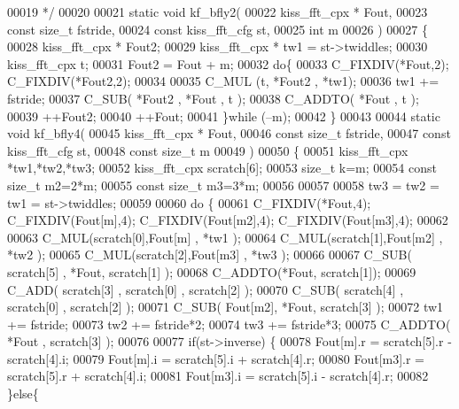 \begin{DoxyCode}
00019 \textcolor{comment}{ */}
00020 
00021 \textcolor{keyword}{static} \textcolor{keywordtype}{void} kf_bfly2(
00022         kiss_fft_cpx * Fout,
00023         \textcolor{keyword}{const} \textcolor{keywordtype}{size\_t} fstride,
00024         \textcolor{keyword}{const} kiss_fft_cfg st,
00025         \textcolor{keywordtype}{int} m
00026         )
00027 \{
00028     kiss_fft_cpx * Fout2;
00029     kiss_fft_cpx * tw1 = st->twiddles;
00030     kiss_fft_cpx t;
00031     Fout2 = Fout + m;
00032     \textcolor{keywordflow}{do}\{
00033         C_FIXDIV(*Fout,2); C_FIXDIV(*Fout2,2);
00034 
00035         C_MUL (t,  *Fout2 , *tw1);
00036         tw1 += fstride;
00037         C_SUB( *Fout2 ,  *Fout , t );
00038         C_ADDTO( *Fout ,  t );
00039         ++Fout2;
00040         ++Fout;
00041     \}\textcolor{keywordflow}{while} (--m);
00042 \}
00043 
00044 \textcolor{keyword}{static} \textcolor{keywordtype}{void} kf_bfly4(
00045         kiss_fft_cpx * Fout,
00046         \textcolor{keyword}{const} \textcolor{keywordtype}{size\_t} fstride,
00047         \textcolor{keyword}{const} kiss_fft_cfg st,
00048         \textcolor{keyword}{const} \textcolor{keywordtype}{size\_t} m
00049         )
00050 \{
00051     kiss_fft_cpx *tw1,*tw2,*tw3;
00052     kiss_fft_cpx scratch[6];
00053     \textcolor{keywordtype}{size\_t} k=m;
00054     \textcolor{keyword}{const} \textcolor{keywordtype}{size\_t} m2=2*m;
00055     \textcolor{keyword}{const} \textcolor{keywordtype}{size\_t} m3=3*m;
00056 
00057 
00058     tw3 = tw2 = tw1 = st->twiddles;
00059 
00060     \textcolor{keywordflow}{do} \{
00061         C_FIXDIV(*Fout,4); C_FIXDIV(Fout[m],4); C_FIXDIV(Fout[m2],4); C_FIXDIV(Fout[m3],4);
00062 
00063         C_MUL(scratch[0],Fout[m] , *tw1 );
00064         C_MUL(scratch[1],Fout[m2] , *tw2 );
00065         C_MUL(scratch[2],Fout[m3] , *tw3 );
00066 
00067         C_SUB( scratch[5] , *Fout, scratch[1] );
00068         C_ADDTO(*Fout, scratch[1]);
00069         C_ADD( scratch[3] , scratch[0] , scratch[2] );
00070         C_SUB( scratch[4] , scratch[0] , scratch[2] );
00071         C_SUB( Fout[m2], *Fout, scratch[3] );
00072         tw1 += fstride;
00073         tw2 += fstride*2;
00074         tw3 += fstride*3;
00075         C_ADDTO( *Fout , scratch[3] );
00076 
00077         \textcolor{keywordflow}{if}(st->inverse) \{
00078             Fout[m].r = scratch[5].r - scratch[4].i;
00079             Fout[m].i = scratch[5].i + scratch[4].r;
00080             Fout[m3].r = scratch[5].r + scratch[4].i;
00081             Fout[m3].i = scratch[5].i - scratch[4].r;
00082         \}\textcolor{keywordflow}{else}\{

\end{DoxyCode}
